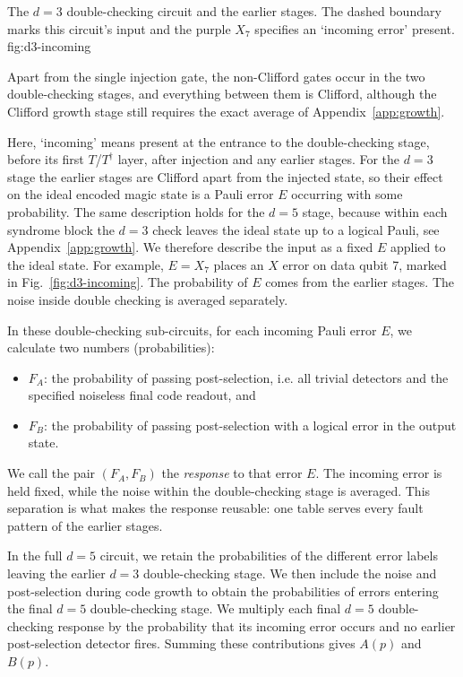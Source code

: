 
{The $d=3$ double-checking circuit and the earlier stages.
The dashed boundary marks this circuit's input and the purple $X_7$ specifies an `incoming error'
present.}
{fig:d3-incoming}

Apart from the single injection gate, the non-Clifford gates occur in the two double-checking stages, and everything between them is Clifford, although the Clifford growth stage still requires the exact average of Appendix~\ref{app:growth}.

Here, `incoming' means present at the entrance to the double-checking stage, before its first $T$/$T^\dagger$ layer, after injection and any earlier stages. For the $d=3$ stage the earlier stages are Clifford apart from the injected state, so their effect on the ideal encoded magic state is a Pauli error $E$ occurring with some probability. The same description holds for the $d=5$ stage, because within each syndrome block the $d=3$ check leaves the ideal state up to a logical Pauli, see Appendix~\ref{app:growth}. We therefore describe the input as a fixed $E$ applied to the ideal state. For example, $E=X_7$ places an $X$ error on data qubit 7, marked in Fig.~\ref{fig:d3-incoming}. The probability of $E$ comes from the earlier stages. The noise inside double checking is averaged separately.

In these double-checking sub-circuits, for each incoming Pauli error $E$, we calculate two numbers (probabilities):
\begin{itemize}
\item $F_A$: the probability of passing post-selection, i.e. all trivial detectors and the specified noiseless final code readout, and
\item $F_B$: the probability of passing post-selection with a logical error in the output state.
\end{itemize}
We call the pair $(F_A,F_B)$ the \emph{response} to that error $E$.
The incoming error is held fixed, while the noise within the double-checking stage is averaged. This separation is what makes the response reusable: one table serves every fault pattern of the earlier stages.

In the full $d=5$ circuit, we retain the probabilities of the
different error labels leaving the earlier $d=3$ double-checking stage.
We then include the noise and post-selection during code growth
to obtain the probabilities of errors entering the final $d=5$ double-checking stage.
We multiply each final $d=5$ double-checking response by the
probability that its incoming error occurs and no earlier
post-selection detector fires. Summing these contributions
gives $A(p)$ and $B(p)$.

